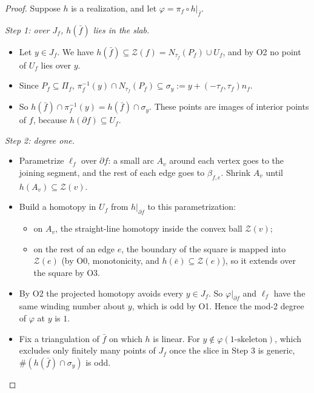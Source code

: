 \documentclass[preprint,12pt]{elsarticle}
\theoremstyle{definition}
\theoremstyle{remark}
\newcommand{\Z}{\mathcal{Z}}
\begin{document}
\begin{proof}
Suppose $h$ is a realization, and let $\varphi=\pi_f\circ h|_{\bar f}$.

\emph{Step 1: over $J_f$, $h(\bar f)$ lies in the slab.}
\begin{itemize}
\item Let $y\in J_f$. We have $h(\bar f)\subseteq\Z(f)=N_{\tau_f}(P_f)\cup U_f$, and by O2 no point of $U_f$ lies over
$y$.
\item Since $P_f\subseteq\Pi_f$, $\pi_f^{-1}(y)\cap N_{\tau_f}(P_f)\subseteq\sigma_y:=y+(-\tau_f,\tau_f)n_f$.
\item So $h(\bar f)\cap\pi_f^{-1}(y)=h(\bar f)\cap\sigma_y$. These points are images of interior points of $f$,
because $h(\partial f)\subseteq U_f$.
\end{itemize}

\emph{Step 2: degree one.}
\begin{itemize}
\item Parametrize $\ell_f$ over $\partial f$: a small arc $A_v$ around each vertex goes to the joining segment, and
the rest of each edge goes to $\beta_{f,e}$. Shrink $A_v$ until $h(A_v)\subseteq\Z(v)$.
\item Build a homotopy in $U_f$ from $h|_{\partial f}$ to this parametrization:
  \begin{itemize}
  \item on $A_v$, the straight-line homotopy inside the convex ball $\Z(v)$;
  \item on the rest of an edge $e$, the boundary of the square is mapped into $\Z(e)$ (by O0, monotonicity, and
  $h(\bar e)\subseteq\Z(e)$), so it extends over the square by O3.
  \end{itemize}
\item By O2 the projected homotopy avoids every $y\in J_f$. So $\varphi|_{\partial f}$ and $\ell_f$ have the same
winding number about $y$, which is odd by O1. Hence the mod-2 degree of $\varphi$ at $y$ is $1$.
\item Fix a triangulation of $\bar f$ on which $h$ is linear. For $y\notin\varphi(\text{1-skeleton})$, which
excludes only finitely many points of $J_f$ once the slice in Step 3 is generic, $\#(h(\bar f)\cap\sigma_y)$ is
odd.
\end{itemize}


\end{proof}
\end{document}

